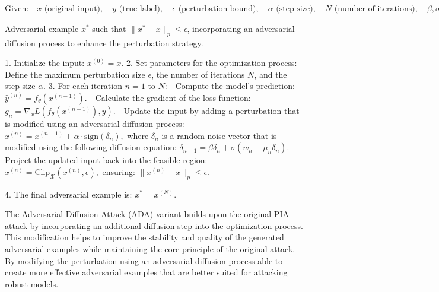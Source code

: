 \[
\text{Given:} \quad x \text{ (original input)}, \quad y \text{ (true label)}, \quad \epsilon \text{ (perturbation bound)}, \quad \alpha \text{ (step size)}, \quad N \text{ (number of iterations)}, \quad \beta, \sigma, \mu_n \text{ (diffusion parameters)}
\]

Adversarial example \( x^* \) such that \( \|x^* - x\|_p \leq \epsilon \), incorporating an adversarial diffusion process to enhance the perturbation strategy.


1. Initialize the input:
   $
   x^{(0)} = x.
   $
2. Set parameters for the optimization process:
   - Define the maximum perturbation size $ \epsilon $, the number of iterations $ N $, and the step size $ \alpha $.
3. For each iteration $ n = 1 $ to $ N $:
   - Compute the model's prediction:
     $
     \hat{y}^{(n)} = f_{\theta}(x^{(n-1)}).
     $
   - Calculate the gradient of the loss function:
     $
     g_n = \nabla_x L(f_{\theta}(x^{(n-1)}), y).
     $
   - Update the input by adding a perturbation that is modified using an adversarial diffusion process:
     $
     x^{(n)} = x^{(n-1)} + \alpha \cdot \text{sign}(\delta_n),
     $
     where $ \delta_n $ is a random noise vector that is modified using the following diffusion equation:
     $
     \delta_{n+1} = \beta \delta_n + \sigma (w_n - \mu_n \delta_n).
     $
   - Project the updated input back into the feasible region:
     $
     x^{(n)} = \text{Clip}_{\mathcal{X}}(x^{(n)}, \epsilon),
     $
     ensuring:
     $
     \|x^{(n)} - x\|_p \leq \epsilon.
     $

4. The final adversarial example is:
   $
   x^* = x^{(N)}.
   $

The Adversarial Diffusion Attack (ADA) variant builds upon the original PIA attack by incorporating an additional diffusion step into the optimization process. This modification helps to improve the stability and quality of the generated adversarial examples while maintaining the core principle of the original attack. By modifying the perturbation using an adversarial diffusion process able to create more effective adversarial examples that are better suited for attacking robust models.